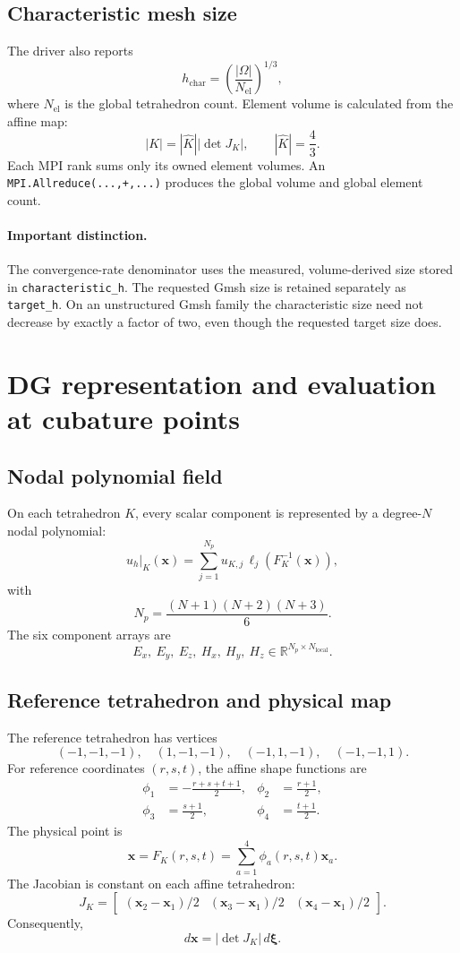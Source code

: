 \documentclass[11pt]{article}
\newcommand{\vect}[1]{\boldsymbol{#1}}
\newcommand{\abs}[1]{\left| #1 \right|}
\newcommand{\code}[1]{\nolinkurl{#1}}
\newcommand{\R}{\mathbb{R}}
\begin{document}
\subsection{Characteristic mesh size}

The driver also reports
\[
  h_{\mathrm{char}}
    =
    \left(\frac{\abs{\Omega}}{N_{\mathrm{el}}}\right)^{1/3},
\]
where \(N_{\mathrm{el}}\) is the global tetrahedron count. Element volume is
calculated from the affine map:
\[
  \abs{K}
    =
    \abs{\widehat K}\abs{\det J_K},
  \qquad
  \abs{\widehat K}=\frac{4}{3}.
\]
Each MPI rank sums only its owned element volumes. An
\code{MPI.Allreduce(...,+,...)} produces the global volume and global element
count.

\paragraph{Important distinction.}
The convergence-rate denominator uses the measured, volume-derived size stored
in \code{characteristic_h}. The requested Gmsh size is retained separately as
\code{target_h}. On an unstructured Gmsh family the characteristic size need
not decrease by exactly a factor of two, even though the requested target size
does.

\section{DG representation and evaluation at cubature points}

\subsection{Nodal polynomial field}

On each tetrahedron \(K\), every scalar component is represented by a
degree-\(N\) nodal polynomial:
\[
  u_h|_K(\vect x)
    =
    \sum_{j=1}^{N_p}u_{K,j}\,
    \ell_j\!\left(F_K^{-1}(\vect x)\right),
\]
with
\[
  N_p=\frac{(N+1)(N+2)(N+3)}{6}.
\]
The six component arrays are
\[
  E_x,\ E_y,\ E_z,\ H_x,\ H_y,\ H_z
  \in \R^{N_p\times N_{\mathrm{local}}}.
\]

\subsection{Reference tetrahedron and physical map}

The reference tetrahedron has vertices
\[
  (-1,-1,-1),\quad
  (1,-1,-1),\quad
  (-1,1,-1),\quad
  (-1,-1,1).
\]
For reference coordinates \((r,s,t)\), the affine shape functions are
\begin{align}
  \phi_1 &= -\frac{r+s+t+1}{2},&
  \phi_2 &=  \frac{r+1}{2},\\
  \phi_3 &=  \frac{s+1}{2},&
  \phi_4 &=  \frac{t+1}{2}.
\end{align}
The physical point is
\[
  \vect x=F_K(r,s,t)
    =\sum_{a=1}^{4}\phi_a(r,s,t)\vect x_a.
\]
The Jacobian is constant on each affine tetrahedron:
\[
  J_K=
  \begin{bmatrix}
    (\vect x_2-\vect x_1)/2 &
    (\vect x_3-\vect x_1)/2 &
    (\vect x_4-\vect x_1)/2
  \end{bmatrix}.
\]
Consequently,
\[
  d\vect x=\abs{\det J_K}\,d\vect \xi.
\]
\end{document}
